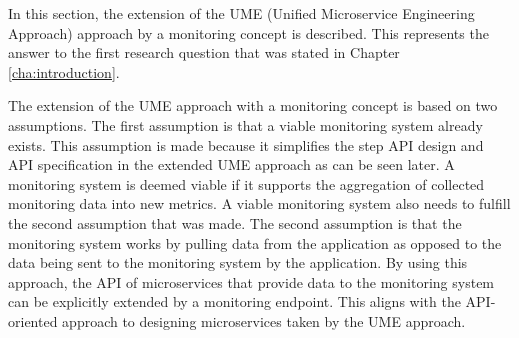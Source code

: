 In this section, the extension of the UME (Unified Microservice Engineering Approach) approach
by a monitoring concept is described. This represents the answer to the first research question
that was stated in Chapter \ref{cha:introduction}.

The extension of the UME approach with a monitoring concept is based on two assumptions.
The first assumption is that a viable monitoring system already exists.
This assumption is made because it simplifies the step API design and API specification in the extended UME approach
as can be seen later.
A monitoring system is deemed viable if it supports the aggregation of collected monitoring data
into new metrics. A viable monitoring system also needs to fulfill the second assumption that was made.
The second assumption is that the monitoring system works by pulling data from the application
as opposed to the data being sent to the monitoring system by the application.
By using this approach, the API of microservices that provide data to the monitoring system
can be explicitly extended by a monitoring endpoint. This aligns with
the API-oriented approach to designing microservices taken by the UME approach.

